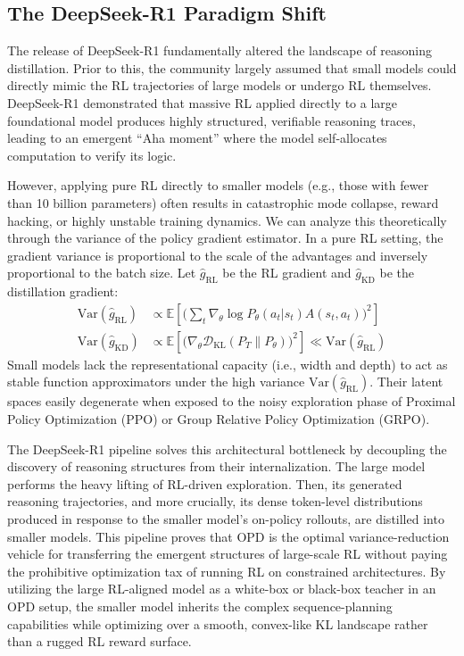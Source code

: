 \documentclass{article} %
\begin{document}
\subsection{The DeepSeek-R1 Paradigm Shift}
The release of DeepSeek-R1 \citep{2501.12948} fundamentally altered the landscape of reasoning distillation. Prior to this, the community largely assumed that small models could directly mimic the RL trajectories of large models or undergo RL themselves. DeepSeek-R1 demonstrated that massive RL applied directly to a large foundational model produces highly structured, verifiable reasoning traces, leading to an emergent ``Aha moment'' where the model self-allocates computation to verify its logic. 

However, applying pure RL directly to smaller models (e.g., those with fewer than 10 billion parameters) often results in catastrophic mode collapse, reward hacking, or highly unstable training dynamics. We can analyze this theoretically through the variance of the policy gradient estimator. In a pure RL setting, the gradient variance is proportional to the scale of the advantages and inversely proportional to the batch size. Let $\hat{g}_{\text{RL}}$ be the RL gradient and $\hat{g}_{\text{KD}}$ be the distillation gradient:
\begin{align}
\text{Var}(\hat{g}_{\text{RL}}) &\propto \mathbb{E}\left[ \Big( \sum_t \nabla_\theta \log P_\theta(a_t|s_t) A(s_t, a_t) \Big)^2 \right] \\
\text{Var}(\hat{g}_{\text{KD}}) &\propto \mathbb{E}\left[ \Big( \nabla_\theta \mathcal{D}_{\text{KL}}(P_T \parallel P_\theta) \Big)^2 \right] \ll \text{Var}(\hat{g}_{\text{RL}})
\end{align}
Small models lack the representational capacity (i.e., width and depth) to act as stable function approximators under the high variance $\text{Var}(\hat{g}_{\text{RL}})$. Their latent spaces easily degenerate when exposed to the noisy exploration phase of Proximal Policy Optimization (PPO) or Group Relative Policy Optimization (GRPO).

The DeepSeek-R1 pipeline solves this architectural bottleneck by decoupling the discovery of reasoning structures from their internalization. The large model performs the heavy lifting of RL-driven exploration. Then, its generated reasoning trajectories, and more crucially, its dense token-level distributions produced in response to the smaller model's on-policy rollouts, are distilled into smaller models. This pipeline proves that OPD is the optimal variance-reduction vehicle for transferring the emergent structures of large-scale RL without paying the prohibitive optimization tax of running RL on constrained architectures. By utilizing the large RL-aligned model as a white-box or black-box teacher in an OPD setup, the smaller model inherits the complex sequence-planning capabilities while optimizing over a smooth, convex-like KL landscape rather than a rugged RL reward surface.
\end{document}
